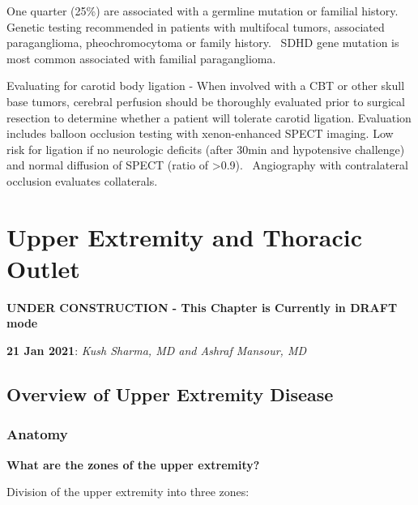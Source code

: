 \documentclass[
]{book}
\begin{document}
One quarter (25\%) are associated with a germline mutation or familial
history. Genetic testing recommended in patients with multifocal tumors,
associated paraganglioma, pheochromocytoma or family history.~ SDHD gene
mutation is most common associated with familial
paraganglioma.\citep{davila2016, kruger2010}

Evaluating for carotid body ligation - When involved with a CBT or other
skull base tumors, cerebral perfusion should be thoroughly evaluated
prior to surgical resection to determine whether a patient will tolerate
carotid ligation. Evaluation includes balloon occlusion testing with
xenon-enhanced SPECT imaging. Low risk for ligation if no neurologic
deficits (after 30min and hypotensive challenge) and normal diffusion of
SPECT (ratio of \textgreater0.9).~ Angiography with contralateral occlusion
evaluates collaterals.\citep{sugawara, tansavatdi2015}

\hypertarget{upper-extremity-and-thoracic-outlet}{%
\chapter{Upper Extremity and Thoracic Outlet}\label{upper-extremity-and-thoracic-outlet}}

\textbf{UNDER CONSTRUCTION - This Chapter is Currently in DRAFT mode}

\textbf{21 Jan 2021}: \emph{Kush Sharma, MD and Ashraf Mansour, MD}

\hypertarget{overview-of-upper-extremity-disease}{%
\section{Overview of Upper Extremity Disease}\label{overview-of-upper-extremity-disease}}

\hypertarget{anatomy}{%
\subsection{Anatomy}\label{anatomy}}

\textbf{What are the zones of the upper
extremity?}\citep{illig57UpperExtremity2019}

Division of the upper extremity into three zones:
\end{document}
